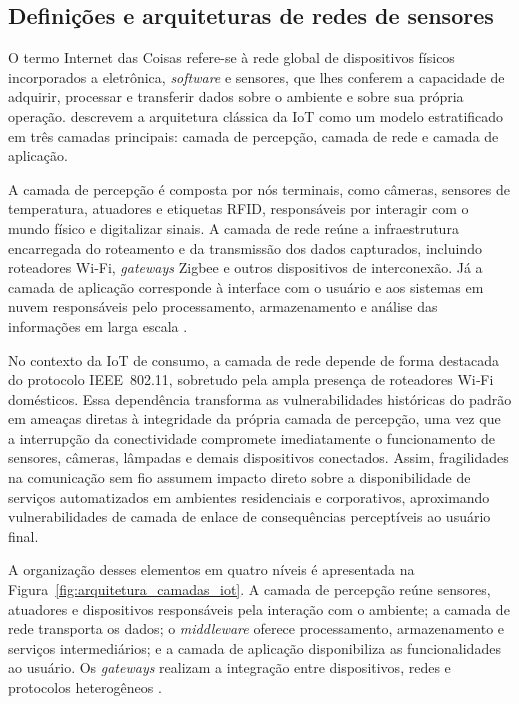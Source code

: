 \subsection{Definições e arquiteturas de redes de sensores}

O termo Internet das Coisas refere-se à rede global de dispositivos físicos incorporados a eletrônica, \textit{software} e sensores, que lhes conferem a capacidade de adquirir, processar e transferir dados sobre o ambiente e sobre sua própria operação.  descrevem a arquitetura clássica da IoT como um modelo estratificado em três camadas principais: camada de percepção, camada de rede e camada de aplicação.

A camada de percepção é composta por nós terminais, como câmeras, sensores de temperatura, atuadores e etiquetas RFID, responsáveis por interagir com o mundo físico e digitalizar sinais. A camada de rede reúne a infraestrutura encarregada do roteamento e da transmissão dos dados capturados, incluindo roteadores Wi‑Fi, \textit{gateways} Zigbee e outros dispositivos de interconexão. Já a camada de aplicação corresponde à interface com o usuário e aos sistemas em nuvem responsáveis pelo processamento, armazenamento e análise das informações em larga escala \cite{LiXuZhao2015}.

No contexto da IoT de consumo, a camada de rede depende de forma destacada do protocolo IEEE~802.11, sobretudo pela ampla presença de roteadores Wi‑Fi domésticos. Essa dependência transforma as vulnerabilidades históricas do padrão em ameaças diretas à integridade da própria camada de percepção, uma vez que a interrupção da conectividade compromete imediatamente o funcionamento de sensores, câmeras, lâmpadas e demais dispositivos conectados. Assim, fragilidades na comunicação sem fio assumem impacto direto sobre a disponibilidade de serviços automatizados em ambientes residenciais e corporativos, aproximando vulnerabilidades de camada de enlace de consequências perceptíveis ao usuário final.

A organização desses elementos em quatro níveis é apresentada na Figura~\ref{fig:arquitetura_camadas_iot}. A camada de percepção reúne sensores, atuadores e dispositivos responsáveis pela interação com o ambiente; a camada de rede transporta os dados; o \textit{middleware} oferece processamento, armazenamento e serviços intermediários; e a camada de aplicação disponibiliza as funcionalidades ao usuário. Os \textit{gateways} realizam a integração entre dispositivos, redes e protocolos heterogêneos \cite{Hassija2019}.

